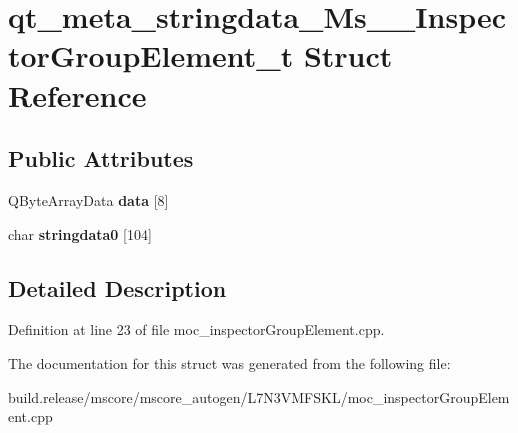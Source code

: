 \hypertarget{structqt__meta__stringdata___ms_____inspector_group_element__t}{}\section{qt\+\_\+meta\+\_\+stringdata\+\_\+\+Ms\+\_\+\+\_\+\+Inspector\+Group\+Element\+\_\+t Struct Reference}
\label{structqt__meta__stringdata___ms_____inspector_group_element__t}
\subsection*{Public Attributes}
\begin{DoxyCompactItemize}
\item 
\mbox{\label{structqt__meta__stringdata___ms_____inspector_group_element__t_aa0a2bf8adf59d3282d4d90765486e42e}} 
Q\+Byte\+Array\+Data {\bfseries data} \mbox{[}8\mbox{]}
\item 
\mbox{\label{structqt__meta__stringdata___ms_____inspector_group_element__t_adb1a2d72301f07a6f0442c48ee4245b4}} 
char {\bfseries stringdata0} \mbox{[}104\mbox{]}
\end{DoxyCompactItemize}


\subsection{Detailed Description}


Definition at line 23 of file moc\+\_\+inspector\+Group\+Element.\+cpp.



The documentation for this struct was generated from the following file\+:\begin{DoxyCompactItemize}
\item 
build.\+release/mscore/mscore\+\_\+autogen/\+L7\+N3\+V\+M\+F\+S\+K\+L/moc\+\_\+inspector\+Group\+Element.\+cpp\end{DoxyCompactItemize}
